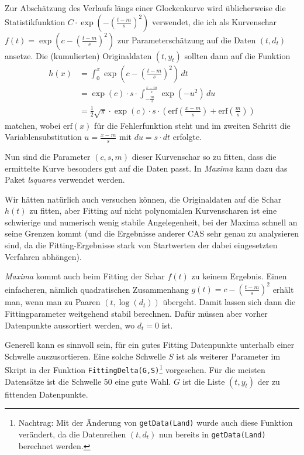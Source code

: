 \documentclass[a4paper,11pt]{article}
\newcommand{\br}[1]{\left(#1\right)}
\newcommand{\erf}{\mathrm{erf}}
\newcommand{\m}{\cdot}
\begin{document}
Zur Abschätzung des Verlaufs längs einer Glockenkurve wird üblicherweise die
Statistikfunktion $C\m\exp\br{-\br{\frac{t-m}{s}}^2}$ verwendet, die ich als
Kurvenschar $f(t)=\exp\br{c-\br{\frac{t-m}{s}}^2}$ zur Parameterschätzung auf
die Daten $(t,d_t)$ ansetze.  Die (kumulierten) Originaldaten $(t,y_t)$
sollten dann auf die Funktion
\begin{align*}
  h(x)&=\int_0^x{\exp\br{c-\br{\frac{t-m}{s}}^2}}\,dt\\ &=\exp(c)\m s\m
  \int_{-\frac{m}{s}}^{\frac{x-m}{s}}{\exp\br{-u^2}}\,du\\ &=\frac12 \sqrt{\pi}\m
  \exp(c)\m s\m \br{\erf\br{\frac{x-m}{s}}+ \erf\br{\frac{m}{s}}}
\end{align*}
matchen, wobei $\erf(x)$ für die Fehlerfunktion steht und im zweiten Schritt
die Variablensubstitution $u=\frac{x-m}{s}$ mit $du=s\m dt$ erfolgte.

Nun sind die Parameter $(c,s,m)$ dieser Kurvenschar so zu fitten, dass die
ermittelte Kurve besonders gut auf die Daten passt.  In \emph{Maxima} kann
dazu das Paket \emph{lsquares} verwendet werden.  

Wir hätten natürlich auch versuchen können, die Originaldaten auf die Schar
$h(t)$ zu fitten, aber Fitting auf nicht polynomialen Kurvenscharen ist eine
schwierige und numerisch wenig stabile Angelegenheit, bei der Maxima schnell
an seine Grenzen kommt (und die Ergebnisse anderer CAS sehr genau zu
analysieren sind, da die Fitting-Ergebnisse stark von Startwerten der dabei
eingesetzten Verfahren abhängen).

\emph{Maxima} kommt auch beim Fitting der Schar $f(t)$ zu keinem Ergebnis.
Einen einfacheren, nämlich quadratischen Zusammenhang
$g(t)=c-\br{\frac{t-m}{s}}^2$ erhält man, wenn man zu Paaren $(t,\log(d_t))$
übergeht.  Damit lassen sich dann die Fittingparameter weitgehend stabil
berechnen. Dafür müssen aber vorher Datenpunkte aussortiert werden, wo $d_t=0$
ist.

Generell kann es sinnvoll sein, für ein gutes Fitting Datenpunkte unterhalb
einer Schwelle auszusortieren. Eine solche Schwelle $S$ ist als weiterer
Parameter im Skript in der Funktion
\texttt{FittingDelta(G,S)}\footnote{Nachtrag: Mit der Änderung von
  \texttt{getData(Land)} wurde auch diese Funktion verändert, da die
  Datenreihen $(t,d_t)$ nun bereits in \texttt{getData(Land)} berechnet
  werden.} vorgesehen. Für die meisten Datensätze ist die Schwelle 50 eine
gute Wahl. $G$ ist die Liste $(t,y_t)$ der zu fittenden Datenpunkte.
\end{document}
